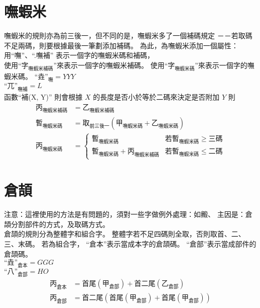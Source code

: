 \documentclass{article}
\begin{document}
\section{嘸蝦米}
嘸蝦米的規則亦為前三後一，但不同的是，嘸蝦米多了一個補碼規定
－－若取碼不足兩碼，則要根據最後一筆劃添加補碼。
為此，為嘸蝦米添加一個屬性：
用``嘸''、``.嘸補'' 表示一個字的嘸蝦米碼和補碼，\\
使用``$\mbox{字}_{\mbox{嘸蝦米補碼}}$''來表示一個字的嘸蝦米補碼。
使用``$\mbox{字}_{\mbox{嘸蝦米碼}}$''來表示一個字的嘸蝦米碼。
$\mbox{``垚''}_{\mbox{嘸}}=YYY$\\
$\mbox{``兀''}_{\mbox{嘸補}}=L$\\
函數``\mbox{補}(X, Y)'' 則會根據 $X$ 的長度是否小於等於二碼來決定是否附加 $Y$
則
\begin{subequations}
  \begin{align}
  \mbox{丙}_{\mbox{嘸蝦米補碼}}&=\mbox{乙}_{\mbox{嘸蝦米補碼}}\\
  \mbox{暫}_{\mbox{嘸蝦米碼}}&=\mbox{取}_{\mbox{前三後一}}(\mbox{甲}_{\mbox{嘸蝦米碼}}+\mbox{乙}_{\mbox{嘸蝦米碼}})\\
  \mbox{丙}_{\mbox{嘸蝦米碼}}&= \left\{\begin{array}{ll}
        \mbox{暫}_{\mbox{嘸蝦米碼}} & \mbox{若$\mbox{暫}_{\mbox{嘸蝦米碼}} \geq $三碼}\\
        \mbox{暫}_{\mbox{嘸蝦米碼}}+\mbox{丙}_{\mbox{嘸蝦米補碼}} & \mbox{若$\mbox{暫}_{\mbox{嘸蝦米碼}} \leq $二碼}
      \end{array}\right.
  \end{align}
\end{subequations}
\section{倉頡}
{\LARGE
注意：這裡使用的方法是有問題的，須對一些字做例外處理：如毈、
主因是：倉頡分割部件的方式，及取碼方式。
}\\

倉頡的規則分為整體字和組合字。
整體字若不足四碼則全取，否則取首、二、三、末碼。
若為組合字，
``倉本''表示當成本字的倉頡碼。
``倉部''表示當成部件的倉頡碼。\\
$\mbox{``垚''}_{\mbox{倉本}}=GGG$\\
$\mbox{``八''}_{\mbox{倉部}}=HO$\\

\begin{subequations}
  \begin{align}
  \mbox{丙}_{\mbox{倉本}}&=\mbox{首尾}(\mbox{甲}_{\mbox{倉部}})
      + \mbox{首二尾}({\mbox{乙}_{\mbox{倉部}}})\\
  \mbox{丙}_{\mbox{倉部}}&= \mbox{首二尾}(
      \mbox{首尾}(\mbox{甲}_{\mbox{倉部}})
      + \mbox{首尾}(\mbox{甲}_{\mbox{倉部}})
      )
  \end{align}
\end{subequations}
\end{document}

